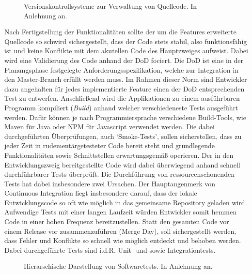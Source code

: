 \begin{center}
	\begin{figure}[H]
		\centering
		\caption[Versionskontrollsysteme zur Verwaltung von Quellcode]{Versionskontrollsysteme zur Verwaltung von Quellcode. In Anlehnung an.}
		\label{fig:VCS}
	\end{figure}
\end{center}
\vspace*{-10mm}
Nach Fertigstellung der Funktionalitäten sollte der um die Features erweiterte Quellcode so schwird sichergestellt, dass der Code stets stabil, also funktionsfähig ist und keine Konflikte mit dem akutellen Code des Hauptzweiges aufweist. Dabei wird eine Validierung des Code anhand der \ac*{DoD} fociert. Die DoD ist eine in der Planungsphase festgelegte Anforderungsspezifikation, welche zur  Integration in den Master-Branch erfüllt werden muss. Im Rahmen dieser Norm sind Entwickler dazu angehalten für jedes implementierte Feature einen der DoD entsprechenden Test zu entwerfen. Anschließend wird die Applikationen zu einem ausführbaren Programm kompiliert (\textit{Build}) anhand welcher verschiedeneste Tests ausgeführt werden. Dafür können je nach Programmiersprache verschiedene Build-Tools, wie Maven für Java oder NPM für Javascript verwendet werden. Die dabei durchgeführten Überprüfungen, auch \enquote*{Smoke-Tests}, sollen  sicherstellen, dass zu jeder Zeit in rudementärgetesteter Code bereit steht und grundlegende Funktionalitäten sowie Schnittstellen erwartungsgemäß operieren. Der in den Entwicklungszweig bereitgestellte Code wird dabei überwiegend anhand schnell durchführbarer Tests überprüft. Die Durchführung von ressourcenschonenden Tests hat dabei insbesondere zwei Ursachen. Der Hauptaugenmerk von Continuous Integration liegt insbesondere darauf, dass der lokale Entwicklungscode so oft wie möglich in das gemeinsame Repository geladen wird. Aufwendige Tests mit einer langen Laufzeit würden Entwickler somit hemmen Code in einer hohen Frequenz bereitzustellen. Statt den gesamten Code vor einem Release vor zusammenzuführen (Merge Day), soll sichergestellt werden, dass Fehler und Konflikte so schnell wie möglich entdeckt und behoben werden. Dabei durchgeführte Tests sind i.d.R. Unit- und sowie Integrationtests.
\begin{center}
	\begin{figure}[H]
		\centering
		\caption[Hierarschische Darstellung von Softwaretests]{Hierarschische Darstellung von Softwaretests. In Anlehnung an.}
		\label{fig:Tests}
	\end{figure}
\end{center}

